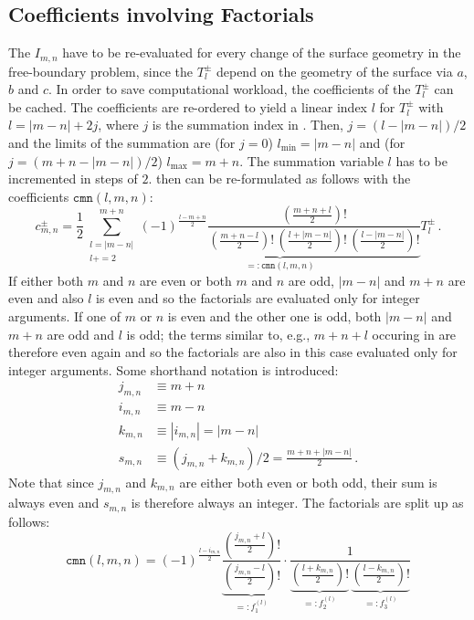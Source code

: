 \subsection{Coefficients involving Factorials}
The $I_{m,n}$ have to be re-evaluated for every change of the surface geometry in the free-boundary problem,
since the $T^{\pm}_l$ depend on the geometry of the surface via $a$, $b$ and $c$.
In order to save computational workload, the coefficients of the $T^{\pm}_l$ can be cached.
The coefficients are re-ordered to yield a linear index $l$ for $T^{\pm}_l$ with $l=|m-n|+2j$,
where $j$ is the summation index in .
Then, $j=(l-|m-n|)/2$ and the limits of the summation
are (for $j=0$)             $l_\textrm{min} = |m-n|$
and (for $j=(m+n-|m-n|)/2$) $l_\textrm{max} = m+n$.
The summation variable $l$ has to be incremented in steps of $2$.
 then can be re-formulated as follows with the coefficients $\mathtt{cmn}(l,m,n)$:
\begin{equation}
    c^{\pm}_{m,n}
  = \frac{1}{2}
    \sum\limits_{\substack{l=|m-n|\\l+=2}}^{m+n}
     \underbrace{
      (-1)^{\frac{l-m+n}{2}}
      \frac{\left(\frac{m+n+l}{2}\right)!}
           {\left(\frac{m+n-l}{2}\right)!\,
            \left(\frac{l+|m-n|}{2}\right)!\,
            \left(\frac{l-|m-n|}{2}\right)!}
     }_{=: \mathtt{cmn}(l,m,n)}
      T^{\pm}_l \, . \label{eqn:c_pm_mn_l}
\end{equation}
If either both $m$ and $n$ are even or both $m$ and $n$ are odd, $|m-n|$ and $m+n$ are even
and also $l$ is even and so the factorials are evaluated only for integer arguments.
If one of $m$ or $n$ is even and the other one is odd, both $|m-n|$ and $m+n$ are odd
and $l$ is odd; the terms similar to, e.g., $m+n+l$ occuring in 
are therefore even again and so the factorials are also in this case evaluated only for integer arguments.
Some shorthand notation is introduced:
\begin{align}
 j_{m,n} &\equiv m+n \nonumber \\
 i_{m,n} &\equiv m-n \nonumber \\
 k_{m,n} &\equiv |i_{m,n}| = |m-n| \nonumber \\
 s_{m,n} &\equiv (j_{m,n}+k_{m,n})/2 = \frac{m+n+|m-n|}{2} \nonumber \, .
\end{align}
Note that since $j_{m,n}$ and $k_{m,n}$ are either both even or both odd,
their sum is always even and $s_{m,n}$ is therefore always an integer.
The factorials are split up as follows:
\begin{equation}
   \mathtt{cmn}(l,m,n)
 = (-1)^\frac{l-i_{m,n}}{2}
   \underbrace{ \frac{\left( \frac{j_{m,n}+l}{2} \right)!}
                     {\left( \frac{j_{m,n}-l}{2} \right)!} }_{=:f_1^{(l)}}
   \cdot
   \frac{1}{
     \underbrace{ \left( \frac{l+k_{m,n}}{2} \right)! }_{=:f_2^{(l)}} \,
     \underbrace{ \left( \frac{l-k_{m,n}}{2} \right)! }_{=:f_3^{(l)}} }
\end{equation}
